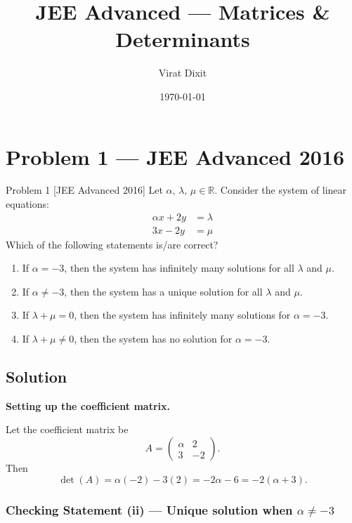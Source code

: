 \documentclass[12pt]{article}
\title{\textbf{JEE Advanced — Matrices \& Determinants}}
\author{Virat Dixit}
\date{\today}
\begin{document}
\maketitle

\section{Problem 1 — JEE Advanced 2016}

\begin{problembox}{Problem 1 \hfill \normalfont\small [JEE Advanced 2016]}
Let $\alpha,\,\lambda,\,\mu \in \mathbb{R}$. Consider the system of linear equations:
\begin{align*}
\alpha x + 2y &= \lambda \\
3x - 2y &= \mu
\end{align*}
Which of the following statements is/are correct?

\begin{enumerate}[label=(\roman*)]
  \item If $\alpha = -3$, then the system has infinitely many solutions for all $\lambda$ and $\mu$.
  \item If $\alpha \neq -3$, then the system has a unique solution for all $\lambda$ and $\mu$.
  \item If $\lambda + \mu = 0$, then the system has infinitely many solutions for $\alpha = -3$.
  \item If $\lambda + \mu \neq 0$, then the system has no solution for $\alpha = -3$.
\end{enumerate}
\end{problembox}

\subsection*{Solution}

\textbf{Setting up the coefficient matrix.}

Let the coefficient matrix be
\[
A = \begin{pmatrix} \alpha & 2 \\ 3 & -2 \end{pmatrix}.
\]
Then
\[
\det(A) = \alpha(-2) - 3(2) = -2\alpha - 6 = -2(\alpha + 3).
\]

\subsubsection*{Checking Statement (ii) — Unique solution when $\alpha \neq -3$}
\end{document}
